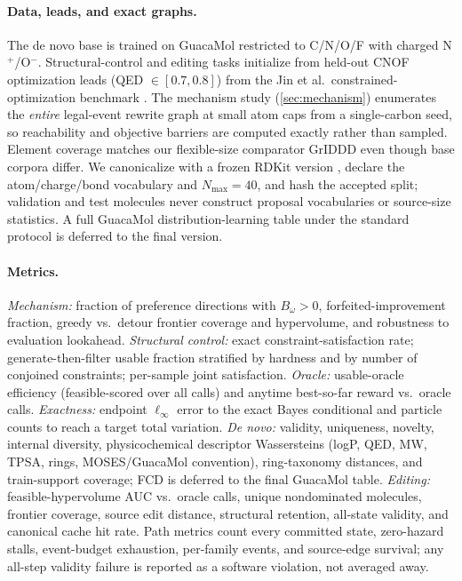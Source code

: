 \documentclass{article}
\theoremstyle{definition}
\theoremstyle{remark}
\begin{document}
\paragraph{Data, leads, and exact graphs.}
The de novo base is trained on GuacaMol \citep{brown2019guacamol} restricted to C/N/O/F with charged N$^+$/O$^-$. Structural-control and editing tasks initialize from held-out CNOF optimization leads (QED $\in[0.7,0.8]$) from the Jin et al.\ constrained-optimization benchmark \citep{jin2018jtvae}. The mechanism study (\cref{sec:mechanism}) enumerates the \emph{entire} legal-event rewrite graph at small atom caps from a single-carbon seed, so reachability and objective barriers are computed exactly rather than sampled. Element coverage matches our flexible-size comparator GrIDDD \citep{ninniri2025griddd} even though base corpora differ. We canonicalize with a frozen RDKit version \citep{rdkit}, declare the atom/charge/bond vocabulary and $N_{\max}=40$, and hash the accepted split; validation and test molecules never construct proposal vocabularies or source-size statistics. A full GuacaMol distribution-learning table under the standard protocol is deferred to the final version.

\paragraph{Metrics.}
\emph{Mechanism:} fraction of preference directions with $B_\omega>0$, forfeited-improvement fraction, greedy vs.\ detour frontier coverage and hypervolume, and robustness to evaluation lookahead. \emph{Structural control:} exact constraint-satisfaction rate; generate-then-filter usable fraction stratified by hardness and by number of conjoined constraints; per-sample joint satisfaction. \emph{Oracle:} usable-oracle efficiency (feasible-scored over all calls) and anytime best-so-far reward vs.\ oracle calls. \emph{Exactness:} endpoint $\ell_\infty$ error to the exact Bayes conditional and particle counts to reach a target total variation. \emph{De novo:} validity, uniqueness, novelty, internal diversity, physicochemical descriptor Wassersteins (logP, QED, MW, TPSA, rings, MOSES/GuacaMol convention), ring-taxonomy distances, and train-support coverage; FCD is deferred to the final GuacaMol table. \emph{Editing:} feasible-hypervolume AUC vs.\ oracle calls, unique nondominated molecules, frontier coverage, source edit distance, structural retention, all-state validity, and canonical cache hit rate. Path metrics count every committed state, zero-hazard stalls, event-budget exhaustion, per-family events, and source-edge survival; any all-step validity failure is reported as a software violation, not averaged away.
\end{document}
